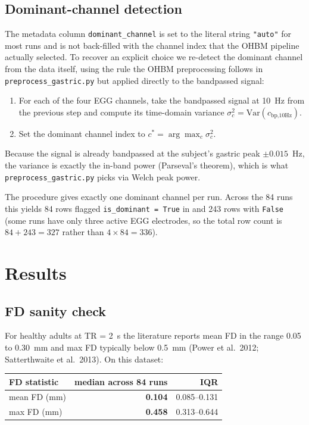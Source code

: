 \documentclass[11pt]{article}
\begin{document}
\subsection{Dominant-channel detection}

The metadata column \texttt{dominant\_channel} is set to the literal
string \verb|"auto"| for most runs and is not back-filled with the
channel index that the OHBM pipeline actually selected. To recover an
explicit choice we re-detect the dominant channel from the data itself,
using the rule the OHBM preprocessing follows in
\texttt{preprocess\_gastric.py} but applied directly to the bandpassed
signal:

\begin{enumerate}
\item For each of the four EGG channels, take the bandpassed signal at
10~Hz from the previous step and compute its time-domain variance
$\sigma^{2}_{c} = \mathrm{Var}(c_{\text{bp,10Hz}})$.
\item Set the dominant channel index to
$c^{*} = \arg\max_{c}\sigma^{2}_{c}$.
\end{enumerate}

Because the signal is already bandpassed at the subject's gastric peak
$\pm 0.015$~Hz, the variance is exactly the in-band power (Parseval's
theorem), which is what \texttt{preprocess\_gastric.py} picks via
Welch peak power.

The procedure gives exactly one dominant channel per run. Across the
84 runs this yields 84 rows flagged \verb|is_dominant = True| in
 and 243 rows with
\verb|False| (some runs have only three active EGG electrodes, so the
total row count is $84 + 243 = 327$ rather than $4 \times 84 = 336$).

\section{Results}

\subsection{FD sanity check}

For healthy adults at TR = 2~s the literature reports mean FD in the
range 0.05 to 0.30~mm and max FD typically below 0.5~mm (Power et al.\
2012; Satterthwaite et al.\ 2013). On this dataset:

\begin{table}[h!]
\centering
\begin{tabular}{lrr}
\toprule
FD statistic                & median across 84 runs & IQR \\ \midrule
mean FD (mm)                & \textbf{0.104} & 0.085--0.131 \\
max FD (mm)                 & \textbf{0.458} & 0.313--0.644 \\
\bottomrule
\end{tabular}
\end{table}
\end{document}
